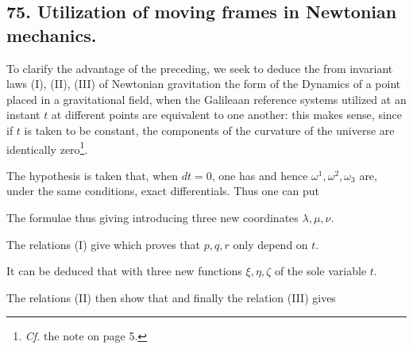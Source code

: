 \subsection*{75. Utilization of moving frames in Newtonian mechanics.}

To clarify the advantage of the preceding, we seek to deduce the from invariant laws (I), (II), (III) of Newtonian gravitation the form of the Dynamics of a point placed in a gravitational field, when the Galileaan reference systems utilized at an instant $t$ at different points are equivalent to one another: this makes sense, since if $t$ is taken to be constant, the components of the curvature of the universe are identically zero\footnote{\textit{Cf.} the note on page 5.}.

The hypothesis is taken that, when $dt = 0$, one has
and hence $\omega^1, \omega^2, \omega_3$ are, under the same conditions, exact differentials. Thus one can put

The formulae
thus giving
introducing three new coordinates $\lambda, \mu, \nu$.

The relations (I) give
which proves that $p,q,r$ only depend on $t$.

It can be deduced that
with three new functions $\xi, \eta, \zeta$ of the sole variable $t$.

The relations (II) then show that
and finally the relation (III) gives

